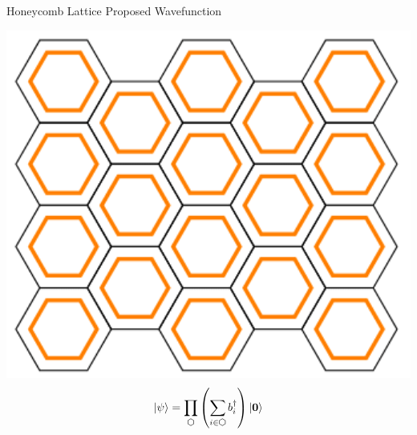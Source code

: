 \begin{block}{Honeycomb Lattice Proposed Wavefunction}
\begin{center}
    \includegraphics[width=6in]{diagrams/fbi3.png}
$$
\ket{\psi} = \prod\limits_{\varhexagon} \left(\sum\limits_{i \in \varhexagon} b^{\dagger}_i \right) \ket{\mathbf{0}}
$$
\end{center}
\end{block}